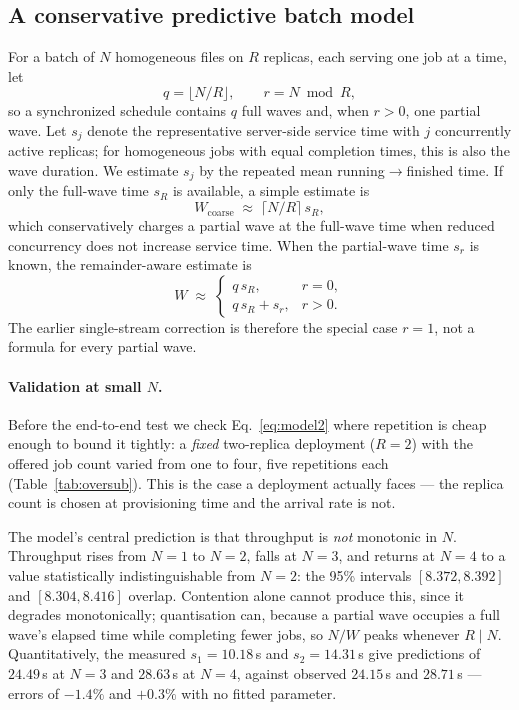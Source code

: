 \documentclass[10pt]{article}
\begin{document}
\subsection{A conservative predictive batch model}
\label{sec:model}
For a batch of $N$ homogeneous files on $R$ replicas, each serving one job at a
time, let
\begin{equation*}
  q=\lfloor N/R\rfloor, \qquad r=N\bmod R,
\end{equation*}
so a synchronized schedule contains $q$ full waves and, when $r>0$, one partial
wave. Let $s_j$ denote the representative server-side service time with $j$
concurrently active replicas; for homogeneous jobs with equal completion times,
this is also the wave duration. We estimate $s_j$ by the repeated mean
running$\rightarrow$finished time. If only the full-wave time $s_R$ is
available, a simple estimate is
\begin{equation}
  W_{\mathrm{coarse}} \;\approx\; \lceil N/R\rceil\,s_R,
  \label{eq:model}
\end{equation}
which conservatively charges a partial wave at the full-wave time when reduced
concurrency does not increase service time. When the partial-wave time $s_r$ is
known, the remainder-aware estimate is
\begin{equation}
  W \;\approx\;
  \begin{cases}
    q\,s_R,       & r=0,\\
    q\,s_R+s_r,   & r>0.
  \end{cases}
  \label{eq:model2}
\end{equation}
The earlier single-stream correction is therefore the special case $r=1$, not
a formula for every partial wave.

\paragraph{Validation at small $N$.} Before the end-to-end test we check
Eq.~\eqref{eq:model2} where repetition is cheap enough to bound it tightly:
a \emph{fixed} two-replica deployment ($R{=}2$) with the offered job count
varied from one to four, five repetitions each (Table~\ref{tab:oversub}). This
is the case a deployment actually faces --- the replica count is chosen at
provisioning time and the arrival rate is not.

The model's central prediction is that throughput is \emph{not} monotonic in
$N$. Throughput rises from $N{=}1$ to $N{=}2$, falls at $N{=}3$, and returns at
$N{=}4$ to a value statistically indistinguishable from $N{=}2$: the 95\%
intervals $[8.372, 8.392]$ and $[8.304, 8.416]$ overlap. Contention alone
cannot produce this, since it degrades monotonically; quantisation can, because
a partial wave occupies a full wave's elapsed time while completing fewer jobs,
so $N/W$ peaks whenever $R \mid N$. Quantitatively, the measured $s_1 =
10.18$\,s and $s_2 = 14.31$\,s give predictions of $24.49$\,s at $N{=}3$ and
$28.63$\,s at $N{=}4$, against observed $24.15$\,s and $28.71$\,s --- errors of
$-1.4\%$ and $+0.3\%$ with no fitted parameter.
\end{document}
